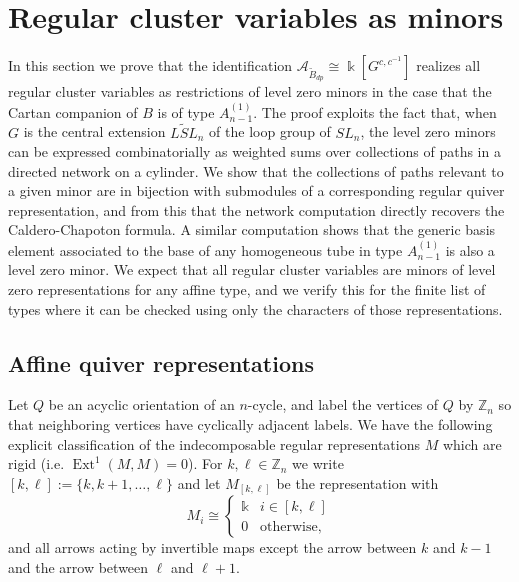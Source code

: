 \documentclass[12pt]{amsart}
\newcommand{\cA}{\mathcal{A}}
\newcommand{\ZZ}{\mathbb{Z}}
\newcommand{\kk}{\Bbbk}
\DeclareMathOperator{\Ext}{Ext}
\newcommand{\Bdp}{\widetilde{B}_{dp}}
\newcommand{\Qrep}{M}
\theoremstyle{remark}
\numberwithin{equation}{section}
\numberwithin{figure}{section}
\begin{document}
\section{Regular cluster variables as minors}

In this section we prove that the identification $\cA_{\Bdp} \cong \kk[G^{c,c^{-1}}]$ realizes all regular cluster variables as restrictions of level zero minors in the case that the Cartan companion of $B$ is of type $A_{n-1}^{\!(1)}$.
The proof exploits the fact that, when $G$ is the central extension $\widetilde{LSL}_n$ of the loop group of $SL_n$, the level zero minors can be expressed combinatorially as weighted sums over collections of paths in a directed network on a cylinder.
We show that the collections of paths relevant to a given minor are in bijection with submodules of a corresponding regular quiver representation, and from this that the network computation directly recovers the Caldero-Chapoton formula.
A similar computation shows that the generic basis element associated to the base of any homogeneous tube in type $A_{n-1}^{\!(1)}$ is also a level zero minor.
We expect that all regular cluster variables are minors of level zero representations for any affine type, and we verify this for the finite list of types where it can be checked using only the characters of those representations.

\subsection{Affine quiver representations}
\label{sec:rigidregular}
Let $Q$ be an acyclic orientation of an $n$-cycle, and label the vertices of $Q$ by $\ZZ_n$ so that neighboring vertices have cyclically adjacent labels.
We have the following explicit classification of the indecomposable regular representations $\Qrep$ which are rigid (i.e. $\Ext^1(\Qrep,\Qrep)=0$).
For $k,\ell\in\ZZ_n$ we write $[k,\ell]:=\{k,k+1,\ldots,\ell\}$ and let $\Qrep_{[k,\ell]}$ be the representation with
\[
  \Qrep_i \cong \begin{cases} \kk & i \in [k,\ell] \\ 0 & \text{otherwise,} \end{cases}
\]
and all arrows acting by invertible maps except the arrow between $k$ and $k-1$ and the arrow between $\ell$ and $\ell + 1$.
\end{document}
